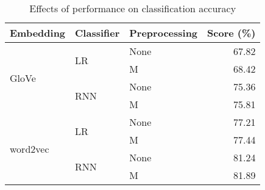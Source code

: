 \begin{table}
	\centering
	\begin{tabular}{| l | l | l | r |}
		\hline
		\textbf{Embedding} & \textbf{Classifier} & \textbf{Preprocessing} & \textbf{Score} (\%) \\ \hline
		\multirow{4}{*}{GloVe} & \multirow{2}{*}{LR} & None & 67.82 \\ \cline{3-4}
		& & M & 68.42 \\ \cline{2-4}
		& \multirow{2}{*}{RNN} & None & 75.36 \\ \cline{3-4}
		& & M & 75.81 \\ \hline
		\multirow{4}{*}{word2vec} & \multirow{2}{*}{LR} & None & 77.21 \\ \cline{3-4}
		& & M & 77.44 \\ \cline{2-4}
		& \multirow{2}{*}{RNN} & None & 81.24 \\ \cline{3-4}
		& & M & 81.89 \\ \hline
	\end{tabular}
	\caption{Effects of performance on classification accuracy}
	\label{tab:embedding-evaluation}
\end{table}